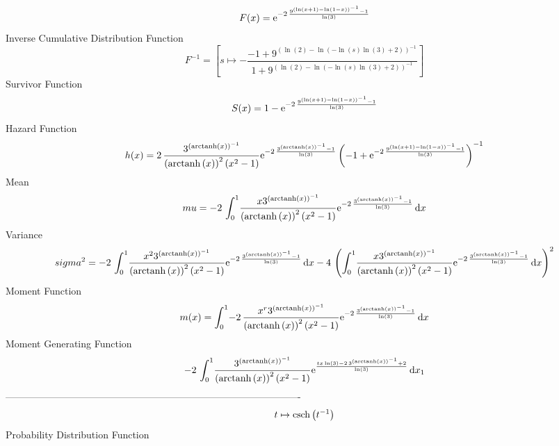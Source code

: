 \documentclass[12pt]{article}
\begin{document}
 $$F(x)={{\rm e}^{-2\,{\frac {{9}^{ \left( \ln  \left( x+1 \right) -\ln 
 \left( 1-x \right)  \right) ^{-1}}-1}{\ln  \left( 3 \right) }}}}
$$ Inverse Cumulative Distribution Function 
  $$F^{-1} = [s\mapsto -{\frac {-1+{9}^{ \left( \ln  \left( 2 \right) -\ln  \left( 
-\ln  \left( s \right) \ln  \left( 3 \right) +2 \right)  \right) ^{-1}
}}{1+{9}^{ \left( \ln  \left( 2 \right) -\ln  \left( -\ln  \left( s
 \right) \ln  \left( 3 \right) +2 \right)  \right) ^{-1}}}}]
$$Survivor Function 
 $$ S(x)=1-{{\rm e}^{-2\,{\frac {{9}^{ \left( \ln  \left( x+1 \right) -\ln 
 \left( 1-x \right)  \right) ^{-1}}-1}{\ln  \left( 3 \right) }}}}
$$ Hazard Function 
 $$ h(x)=2\,{\frac {{3}^{ \left( {\rm arctanh} \left(x\right) \right) ^{-1}}}{
 \left( {\rm arctanh} \left(x\right) \right) ^{2} \left( {x}^{2}-1
 \right) }{{\rm e}^{-2\,{\frac {{3}^{ \left( {\rm arctanh} \left(x
\right) \right) ^{-1}}-1}{\ln  \left( 3 \right) }}}} \left( -1+{
{\rm e}^{-2\,{\frac {{9}^{ \left( \ln  \left( x+1 \right) -\ln 
 \left( 1-x \right)  \right) ^{-1}}-1}{\ln  \left( 3 \right) }}}}
 \right) ^{-1}}
$$Mean 
 $$ mu=-2\,\int_{0}^{1}\!{\frac {x{3}^{ \left( {\rm arctanh} \left(x\right)
 \right) ^{-1}}}{ \left( {\rm arctanh} \left(x\right) \right) ^{2}
 \left( {x}^{2}-1 \right) }{{\rm e}^{-2\,{\frac {{3}^{ \left( 
{\rm arctanh} \left(x\right) \right) ^{-1}}-1}{\ln  \left( 3 \right) }
}}}}\,{\rm d}x
$$ Variance 
 $$ sigma^2 = -2\,\int_{0}^{1}\!{\frac {{x}^{2}{3}^{ \left( {\rm arctanh} \left(x
\right) \right) ^{-1}}}{ \left( {\rm arctanh} \left(x\right) \right) ^
{2} \left( {x}^{2}-1 \right) }{{\rm e}^{-2\,{\frac {{3}^{ \left( 
{\rm arctanh} \left(x\right) \right) ^{-1}}-1}{\ln  \left( 3 \right) }
}}}}\,{\rm d}x-4\, \left( \int_{0}^{1}\!{\frac {x{3}^{ \left( 
{\rm arctanh} \left(x\right) \right) ^{-1}}}{ \left( {\rm arctanh} 
\left(x\right) \right) ^{2} \left( {x}^{2}-1 \right) }{{\rm e}^{-2\,{
\frac {{3}^{ \left( {\rm arctanh} \left(x\right) \right) ^{-1}}-1}{
\ln  \left( 3 \right) }}}}}\,{\rm d}x \right) ^{2}
$$Moment Function 
 $$ m(x) = \int_{0}^{1}\!-2\,{\frac {{x}^{r}{3}^{ \left( {\rm arctanh} \left(x
\right) \right) ^{-1}}}{ \left( {\rm arctanh} \left(x\right) \right) ^
{2} \left( {x}^{2}-1 \right) }{{\rm e}^{-2\,{\frac {{3}^{ \left( 
{\rm arctanh} \left(x\right) \right) ^{-1}}-1}{\ln  \left( 3 \right) }
}}}}\,{\rm d}x
$$ Moment Generating Function 
 $$-2\,\int_{0}^{1}\!{\frac {{3}^{ \left( {\rm arctanh} \left(x\right)
 \right) ^{-1}}}{ \left( {\rm arctanh} \left(x\right) \right) ^{2}
 \left( {x}^{2}-1 \right) }{{\rm e}^{{\frac {tx\ln  \left( 3 \right) -
2\,{3}^{ \left( {\rm arctanh} \left(x\right) \right) ^{-1}}+2}{\ln 
 \left( 3 \right) }}}}}\,{\rm d}x_{{1}}
$$-------------------------------------------------------------------------------------------  \\$$t\mapsto {\rm csch} \left({t}^{-1}\right)
$$Probability Distribution Function 
\end{document}
